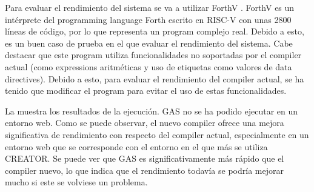 \evalres


Para evaluar el rendimiento del sistema se va a utilizar ForthV
\parencite{ForthV}. ForthV es un intérprete del \gls{programming language} Forth
escrito en  RISC-V \parencite{RISC-V} con unas
2800 líneas de código, por lo que representa un \gls{program} complejo real.
Debido a esto, es un buen caso de prueba en el que evaluar el rendimiento del
sistema. Cabe destacar que este \gls{program} utiliza funcionalidades no
soportadas por el \gls{compiler} actual (como \glspl{expression} aritméticas y
uso de etiquetas como valores de \glspl{data directive}). Debido a esto, para
evaluar el rendimiento del \gls{compiler} actual, se ha tenido que modificar el
\gls{program} para evitar el uso de estas funcionalidades.

La  muestra los resultados de la ejecución. \gls{GAS} no
se ha podido ejecutar en un entorno web. Como se puede observar, el nuevo
\gls{compiler} ofrece una mejora significativa de rendimiento con respecto del
\gls{compiler} actual, especialmente en un entorno web que se corresponde con el
entorno en el que más se utiliza CREATOR. Se puede ver que \gls{GAS} es
significativamente más rápido que el \gls{compiler} nuevo, lo que indica que el
rendimiento todavía se podría mejorar mucho si este se volviese un problema.


